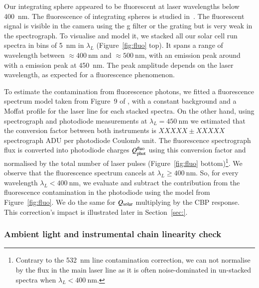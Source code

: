 Our integrating sphere appeared to be fluorescent at laser wavelengths below \SI{400}{\nano\meter}. The fluorescence of integrating spheres is studied in~\cite{shaw2007ultraviolet}. The fluorescent signal is visible in the \SD camera using the g filter or the grating but is very weak in the spectrograph. To visualise and model it, we stacked all our solar cell run spectra in bins of \SI{5}{\nano\meter} in $\lambda_L$ (Figure~\ref{fig:fluo} top). It spans a range of wavelength between $\approx \SI{400}{\nano\meter}$ and $\approx\SI{500}{\nano\meter}$, with an emission peak around with a emission peak at \SI{450}{\nano\meter}. The peak amplitude depends on the laser wavelength, as expected for a fluorescence phenomenon. 

To estimate the contamination from fluorescence photons, we fitted a fluorescence spectrum model taken from Figure~9 of \cite{shaw2007ultraviolet}, with a constant background and a Moffat profile for the laser line for each stacked spectra. On the other hand, using spectrograph and photodiode measurements at $\lambda_L=\SI{450}{\nano\meter}$ we estimated that the conversion factor between both instruments is $XXXXX\pm XXXXX$ spectrograph ADU per photodiode Coulomb unit. The fluorescence spectrograph flux is converted into photodiode charges $Q_{\mathrm{phot}}^{\mathrm{fluo}}$ using this conversion factor and normalised by the total number of laser pulses (Figure~\ref{fig:fluo} bottom)\footnote{Contrary to the \SI{532}{\nano\meter} line contamination correction, we can not normalise by the flux in the main laser line as it is often noise-dominated in un-stacked spectra when $\lambda_L < \SI{400}{\nano\meter}$.}. We observe that the fluorescence spectrum cancels at $\lambda_L \geq \SI{400}{\nano\meter}$. So, for every wavelength $\lambda_L < \SI{400}{\nano\meter}$, we evaluate and subtract the contribution from the fluorescence contamination in the photodiode using the model from Figure~\ref{fig:fluo}. We do the same for $Q_{\mathrm{solar}}$ multiplying by the CBP response. This correction's impact is illustrated later in Section~\ref{sec:}.





\subsubsection{Ambient light and instrumental chain linearity check}\label{sec:sc_linearity}


